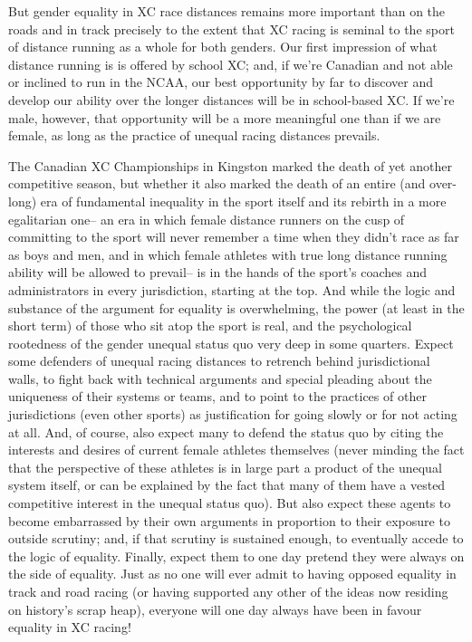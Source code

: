 But gender equality in XC race distances remains more important than on the roads and in track precisely to the extent that XC racing is seminal to the sport of distance running as a whole for both genders. Our first impression of what distance running is is offered by school XC; and, if we're Canadian and not able or inclined to run in the NCAA, our best opportunity by far to discover and develop our ability over the longer distances will be in school-based XC. If we're male, however, that opportunity will be a more meaningful one than if we are female, as long as the practice of unequal racing distances prevails.

The Canadian XC Championships in Kingston marked the death of yet another competitive season, but whether it also marked the death of an entire (and over-long) era of fundamental inequality in the sport itself and its rebirth in a more egalitarian one-- an era in which female distance runners on the cusp of committing to the sport will never remember a time when they didn't race as far as boys and men, and in which female athletes with true long distance running ability will be allowed to prevail-- is in the hands of the sport's coaches and administrators in every jurisdiction, starting at the top. And while the logic and substance of the argument for equality is overwhelming, the power (at least in the short term) of those who sit atop the sport is real, and the psychological rootedness of the gender unequal status quo very deep in some quarters. Expect some defenders of unequal racing distances to retrench behind jurisdictional walls, to fight back with technical arguments and special pleading about the uniqueness of their systems or teams, and to point to the practices of other jurisdictions (even other sports) as justification for going slowly or for not acting at all. And, of course, also expect many to defend the status quo by citing the interests and desires of current female athletes themselves (never minding the fact that the perspective of these athletes is in large part a product of the unequal system itself, or can be explained by the fact that many of them have a vested competitive interest in the unequal status quo). But also expect these agents to become embarrassed by their own arguments in proportion to their exposure to outside scrutiny; and, if that scrutiny is sustained enough, to eventually accede to the logic of equality. Finally, expect them to one day pretend they were always on the side of equality. Just as no one will ever admit to having opposed equality in track and road racing (or having supported any other of the ideas now residing on history's scrap heap), everyone will one day always have been in favour equality in XC racing!




